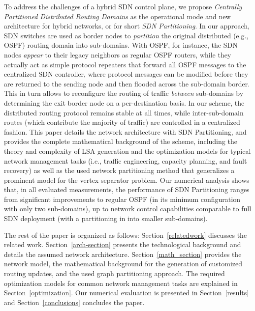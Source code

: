 \documentclass[journal]{IEEEtran}
\begin{document}
\par To address the challenges of a hybrid SDN control plane, we propose \emph{Centrally Partitioned Distributed Routing Domains} as the operational mode and new architecture for hybrid networks, or for short \emph{SDN Partitioning}. In our approach, SDN switches are used as border nodes to \emph{partition} the original distributed (e.g., OSPF) routing domain into sub-domains. With OSPF, for instance, the SDN nodes \emph{appear} to their legacy neighbors as regular OSPF routers, while they actually act as simple protocol repeaters that forward all OSPF messages to the centralized SDN controller, where protocol messages can be modified before they are returned to the sending node and then flooded across the sub-domain border. This in turn allows to reconfigure the routing of traffic \emph{between} sub-domains by determining the exit border node on a per-destination basis. In our scheme, the distributed routing protocol remains stable at all times, while inter-sub-domain routes (which contribute the majority of traffic) are controlled in a centralized fashion. This paper details the network architecture with SDN Partitioning, and provides the complete mathematical background of the scheme, including the theory and complexity of LSA generation and the optimization models for typical network management tasks (i.e., traffic engineering, capacity planning, and fault recovery) as well as the used network partitioning method that generalizes a prominent model for the vertex separator problem. Our numerical analysis shows that, in all evaluated measurements, the performance of SDN Partitioning ranges from significant improvements to regular OSPF (in its minimum configuration with only two sub-domains), up to network control capabilities comparable to full SDN deployment (with a partitioning in into smaller sub-domains).

\par The rest of the paper is organized as follows: Section~\ref{relatedwork} discusses the related work. Section~\ref{arch-section} presents the technological background and details the assumed network architecture. Section~\ref{math_section} provides the network model, the mathematical background for the generation of customized routing updates, and the used graph partitioning approach. The required optimization models for common network management tasks are explained in Section~\ref{optimization}. Our numerical evaluation is presented in Section~\ref{results} and Section~\ref{conclusions} concludes the paper. 
\end{document}
